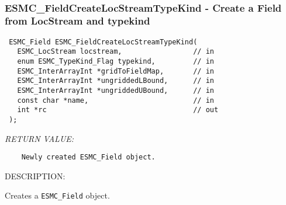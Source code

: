  
\mbox{}\hrulefill\ 
 
\subsubsection [ESMC\_FieldCreateLocStreamTypeKind] {ESMC\_FieldCreateLocStreamTypeKind - Create a Field from LocStream and typekind}


  
\begin{verbatim} ESMC_Field ESMC_FieldCreateLocStreamTypeKind(
   ESMC_LocStream locstream,                 // in
   enum ESMC_TypeKind_Flag typekind,         // in
   ESMC_InterArrayInt *gridToFieldMap,       // in
   ESMC_InterArrayInt *ungriddedLBound,      // in
   ESMC_InterArrayInt *ungriddedUBound,      // in
   const char *name,                         // in
   int *rc                                   // out
 );
 \end{verbatim}{\em RETURN VALUE:}
\begin{verbatim}    Newly created ESMC_Field object.\end{verbatim}
{\sf DESCRIPTION:\\ }


  
    Creates a {\tt ESMC\_Field} object.
  
